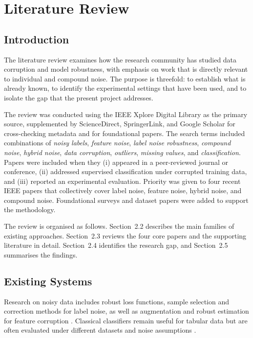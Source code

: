 \chapter{Literature Review}

\section{Introduction}

The literature review examines how the research community has studied data corruption and model robustness, with emphasis on work that is directly relevant to individual and compound noise. The purpose is threefold: to establish what is already known, to identify the experimental settings that have been used, and to isolate the gap that the present project addresses.

The review was conducted using the IEEE Xplore Digital Library as the primary source, supplemented by ScienceDirect, SpringerLink, and Google Scholar for cross-checking metadata and for foundational papers. The search terms included combinations of \emph{noisy labels}, \emph{feature noise}, \emph{label noise robustness}, \emph{compound noise}, \emph{hybrid noise}, \emph{data corruption}, \emph{outliers}, \emph{missing values}, and \emph{classification}. Papers were included when they (i) appeared in a peer-reviewed journal or conference, (ii) addressed supervised classification under corrupted training data, and (iii) reported an experimental evaluation. Priority was given to four recent IEEE papers that collectively cover label noise, feature noise, hybrid noise, and compound noise. Foundational surveys and dataset papers were added to support the methodology.

The review is organised as follows. Section~2.2 describes the main families of existing approaches. Section~2.3 reviews the four core papers and the supporting literature in detail. Section~2.4 identifies the research gap, and Section~2.5 summarises the findings.

\section{Existing Systems}
Research on noisy data includes robust loss functions, sample selection and correction methods for label noise, as well as augmentation and robust estimation for feature corruption \cite{song2023survey,frenay2014classification,huber1964robust}. Classical classifiers remain useful for tabular data but are often evaluated under different datasets and noise assumptions \cite{hastie2009elements}.

